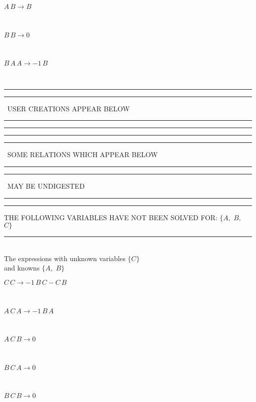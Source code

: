 \begin{minipage}{6in}
$
A\,
 B\rightarrow B
$
\end{minipage}\medskip \\
\begin{minipage}{6in}
$
B\,
 B\rightarrow 0
$
\end{minipage}\medskip \\
\begin{minipage}{6in}
$
B\,
 A\,
 A\rightarrow -1\,
 B
$
\end{minipage}\\
\rule[2pt]{6in}{1pt}\hfil\break
\rule[2.5pt]{1.701in}{1pt}
\ USER CREATIONS APPEAR BELOW\ 
\rule[2.5pt]{1.701in}{1pt}\hfil\break
\rule[2pt]{6in}{1pt}\hfil\break
\rule[2pt]{6in}{4pt}\hfil\break
\rule[2pt]{1.45in}{4pt}
\ SOME RELATIONS WHICH APPEAR BELOW\ 
\rule[2pt]{1.45in}{4pt}\hfil\break
\rule[2pt]{2.18in}{4pt}
\ MAY BE UNDIGESTED\ 
\rule[2pt]{2.18in}{4pt}\hfil\break
\rule[2pt]{6in}{4pt}\hfil\break
THE FOLLOWING VARIABLES HAVE NOT BEEN SOLVED FOR:\hfil\break
$\{A,
$ $
B,
$ $
C\}$
\smallskip\\
\rule[3pt]{6in}{.7pt}\\
The expressions with unknown variables $\{C\}$\\
and knowns $\{A,
$ $
B\}$\smallskip\\
\begin{minipage}{6in}
$
C\,
 C\rightarrow -1\,
 B\,
 C - C\,
 B
$
\end{minipage}\medskip \\
\begin{minipage}{6in}
$
A\,
 C\,
 A\rightarrow -1\,
 B\,
 A
$
\end{minipage}\medskip \\
\begin{minipage}{6in}
$
A\,
 C\,
 B\rightarrow 0
$
\end{minipage}\medskip \\
\begin{minipage}{6in}
$
B\,
 C\,
 A\rightarrow 0
$
\end{minipage}\medskip \\
\begin{minipage}{6in}
$
B\,
 C\,
 B\rightarrow 0
$
\end{minipage}\\
\vspace{10pt}

